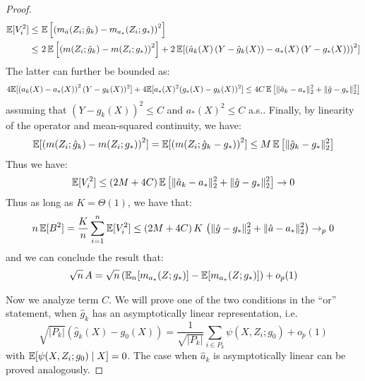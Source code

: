 \begin{proof}
\begin{align}
    \mathbb{E}[V_i^2] \leq~& \mathbb{E}\left[\left(m_{\hat{a}}(Z_i; \hat{g}_k) - m_{a_*}(Z_i; g_*)\right)^2\right] \\
    \leq~& 2\,\mathbb{E}\left[\left(m(Z_i; \hat{g}_k) - m(Z_i; g_*)\right)^2\right] + 2\, \mathbb{E}[\left(\hat{a}_k(X)\,(Y - \hat{g}_k(X)) - a_*(X)\,(Y-g_*(X))\right)^2]
\end{align}
The latter can further be bounded as:
\begin{align}
    4\mathbb{E}[\left(a_k(X) - a_*(X)\right)^2 (Y-g_k(X))^2] + 4\mathbb{E}[a_*(X)^2 (g_*(X) - g_k(X))^2] \leq 4 C\, \mathbb{E}\left[\|\hat{a}_k - a_*\|_2^2 + \|\hat{g} - g_*\|_2^2\right]
\end{align}
assuming that $(Y-\hat{g}_k(X))^2 \leq C$ and $a_*(X)^2 \leq C$ a.s..
Finally, by linearity of the operator and mean-squared continuity, we have:
\begin{equation}
    \mathbb{E}[\left(m(Z_i; \hat{g}_k) - m(Z_i; g_*)\right)^2] = \mathbb{E}[\left(m(Z_i; \hat{g}_k - g_*)\right)^2] \leq M\, \mathbb{E}\left[\|\hat{g}_k - g_*\|_2^2\right]
\end{equation}
Thus we have:
\begin{equation}
    \mathbb{E}[V_i^2] \leq (2M + 4C)\, \mathbb{E}\left[\|\hat{a}_k - a_*\|_2^2 + \|\hat{g} - g_*\|_2^2\right] \to 0
\end{equation}
Thus as long as $K = \Theta(1)$, we have that:
\begin{equation}\label{eqn:crucial-normality}
    n\, \mathbb{E}[B^2] = \frac{K}{n} \sum_{i=1}^n \mathbb{E}[V_i^2] \leq (2M + 4C)\, K\, \left(\|\hat{g}-g_*\|_2^2 + \|\hat{a}-a_*\|_2^2\right) \to_p 0
\end{equation}
and we can conclude the result that:
\begin{align}
    \sqrt{n}\, A = \sqrt{n} \left(\mathbb{E}_n[m_{a_*}(Z; g_*)] - \mathbb{E}[m_{a_*}(Z; g_*)]\right) + o_p(1)
\end{align}


Now we analyze term $C$. We will prove one of the two conditions in the ``or'' statement, when $\hat{g}_k$ has an asymptotically linear representation, i.e. \begin{equation}
\sqrt{|P_k|}\left(\hat{g}_k(X) - g_0(X)\right) = \frac{1}{\sqrt{|P_k|}} \sum_{i\in P_k} \psi(X, Z_i; g_0) + o_p(1)
\end{equation}
with $\mathbb{E}[\psi(X, Z_i; g_0)\mid X]=0$. The case when $\hat{a}_k$ is asymptotically linear can be proved analogously.


\end{proof}

